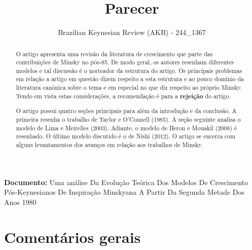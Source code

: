 \documentclass[11pt]{article}
\author{Brazilian Keynesian Review (AKB) - 244\_1367}
\date{}
\title{Parecer}
\begin{document}
\maketitle
\noindent \textbf{Documento:} Uma análise Da Evolução Teórica Dos Modelos De Crescimento Pós-Keynesianos De Inspiração Minskyana A Partir Da Segunda Metade Dos Anos 1980

\begin{abstract}
O artigo apresenta uma revisão da literatura de crescimento que parte das contribuições de Minsky no pós-85.
De modo geral, os autores resenham diferentes modelos e tal discussão é o norteador da estrutura do artigo.
Os principais problemas em relação a artigo em questão dizem respeito a esta estrutura e ao pouco domínio da literatura canônica sobre o tema e em especial no que diz respeito ao próprio Minsky.
Tendo em vista estas considerações, a recomendação é para a \textbf{rejeição} do artigo.

O artigo possui quatro seções principais para além da introdução e da conclusão.
A primeira resenha o trabalho de Taylor e O’Connell (1985).
A seção seguinte analisa o modelo de Lima e Meirelles (2003).
Adiante, o modelo de Heron e Mouakil (2008) é resenhado.
O último modelo discutido é o de Nishi (2012).
O artigo se encerra com alguns levantamentos dos avanços em relação aos trabalhos de Minsky.
\end{abstract}

\section*{Comentários gerais}
\label{sec:orgec145c6}
\end{document}
